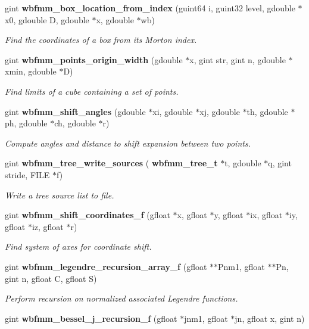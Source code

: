 \begin{DoxyCompactItemize}
gint \textbf{ wbfmm\+\_\+box\+\_\+location\+\_\+from\+\_\+index} (guint64 i, guint32 level, gdouble $\ast$x0, gdouble D, gdouble $\ast$x, gdouble $\ast$wb)
\begin{DoxyCompactList}\small\item\em Find the coordinates of a box from its Morton index. \end{DoxyCompactList}\item 
gint \textbf{ wbfmm\+\_\+points\+\_\+origin\+\_\+width} (gdouble $\ast$x, gint str, gint n, gdouble $\ast$xmin, gdouble $\ast$D)
\begin{DoxyCompactList}\small\item\em Find limits of a cube containing a set of points. \end{DoxyCompactList}\item 
gint \textbf{ wbfmm\+\_\+shift\+\_\+angles} (gdouble $\ast$xi, gdouble $\ast$xj, gdouble $\ast$th, gdouble $\ast$ph, gdouble $\ast$ch, gdouble $\ast$r)
\begin{DoxyCompactList}\small\item\em Compute angles and distance to shift expansion between two points. \end{DoxyCompactList}\item 
gint \textbf{ wbfmm\+\_\+tree\+\_\+write\+\_\+sources} (\textbf{ wbfmm\+\_\+tree\+\_\+t} $\ast$t, gdouble $\ast$q, gint stride, F\+I\+LE $\ast$f)
\begin{DoxyCompactList}\small\item\em Write a tree source list to file. \end{DoxyCompactList}\item 
gint \textbf{ wbfmm\+\_\+shift\+\_\+coordinates\+\_\+f} (gfloat $\ast$x, gfloat $\ast$y, gfloat $\ast$ix, gfloat $\ast$iy, gfloat $\ast$iz, gfloat $\ast$r)
\begin{DoxyCompactList}\small\item\em Find system of axes for coordinate shift. \end{DoxyCompactList}\item 
gint \textbf{ wbfmm\+\_\+legendre\+\_\+recursion\+\_\+array\+\_\+f} (gfloat $\ast$$\ast$Pnm1, gfloat $\ast$$\ast$Pn, gint n, gfloat C, gfloat S)
\begin{DoxyCompactList}\small\item\em Perform recursion on normalized associated Legendre functions. \end{DoxyCompactList}\item 
gint \textbf{ wbfmm\+\_\+bessel\+\_\+j\+\_\+recursion\+\_\+f} (gfloat $\ast$jnm1, gfloat $\ast$jn, gfloat x, gint n)

\end{DoxyCompactItemize}
